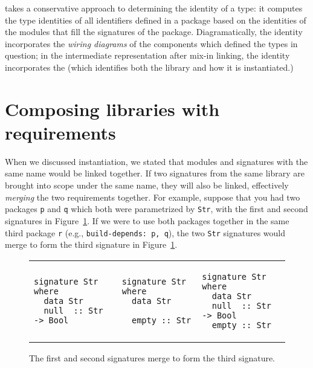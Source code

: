 \Backpack{} takes a conservative approach to determining the
identity of a type: it computes the type identities of all identifiers
defined in a package based on the identities of the modules that fill
the signatures of the package.  Diagramatically, the identity
incorporates the \emph{wiring diagrams} of the components which defined
the types in question; in the intermediate representation after mix-in
linking, the identity incorporates the \uid{} (which
identifies both the library and how it is instantiated.)

\section{Composing libraries with requirements}

When we discussed instantiation, we stated that modules and signatures
with the same name would be linked together.  If two signatures from the
same library are brought into scope under the same name, they will also
be linked, effectively \emph{merging} the two requirements together.
For example, suppose that you had two packages \verb|p| and \verb|q|
which both were parametrized by \verb|Str|, with the first and second
signatures in Figure~\ref{fig:signature-merging}.  If we were to use
both packages together in the same third package \verb|r| (e.g.,
\verb|build-depends: p, q|), the two \verb|Str| signatures would merge
to form the third signature in Figure~\ref{fig:signature-merging}.

\begin{figure}
\begin{tabular}{p{} p{} p{}}
\begin{lstlisting}
signature Str where
  data Str
  null  :: Str -> Bool
\end{lstlisting}
&
\begin{lstlisting}
signature Str where
  data Str

  empty :: Str
\end{lstlisting}
&
\begin{lstlisting}
signature Str where
  data Str
  null  :: Str -> Bool
  empty :: Str
\end{lstlisting}
\end{tabular}
\caption{The first and second signatures merge to form the third signature.}
\label{fig:signature-merging}
\end{figure}

